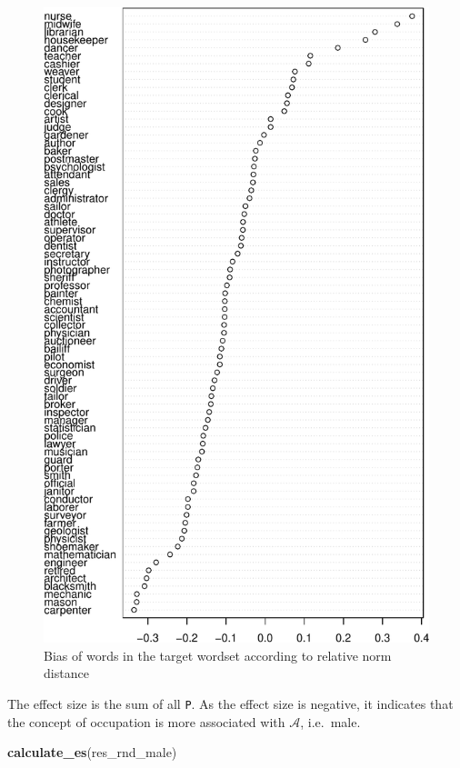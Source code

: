 \documentclass[english,man]{apa6}
\newenvironment{Shaded}{\begin{snugshade}}{\end{snugshade}}
\newcommand{\KeywordTok}[1]{\textcolor[rgb]{0.13,0.29,0.53}{\textbf{#1}}}
\newcommand{\NormalTok}[1]{#1}
\begin{document}
\begin{figure}
\centering
\includegraphics{ica_files/figure-latex/rnd-1.pdf}
\caption{\label{fig:rnd}Bias of words in the target wordset according to relative norm distance}
\end{figure}

The effect size is the sum of all \texttt{P}. As the effect size is negative, it indicates that the concept of occupation is more associated with \(\mathcal{A}\), i.e.~male.

\begin{Shaded}
\begin{Highlighting}[]
\KeywordTok{calculate_es}\NormalTok{(res_rnd_male)}
\end{Highlighting}
\end{Shaded}
\end{document}
